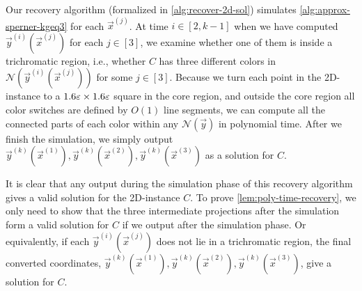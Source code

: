 \begin{algorithm2e}[t]
    \caption{Recover a $2${\rm D}-\Sperner solution from \outofk Approximate \Sperner solutions}
    \label{alg:recover-2d-sol}

    \DontPrintSemicolon




\end{algorithm2e}

Our recovery algorithm (formalized in \cref{alg:recover-2d-sol}) simulates \cref{alg:approx-sperner-kgeq3} for each $\vec{x}^{(j)}$.
At time $i\in [2,k-1]$ when we have computed $\vec{y}^{(i)}(\vec{x}^{(j)})$ for each $j\in [3]$, we examine whether one of them is inside a trichromatic region, i.e., whether $C$ has three different colors in $\mathcal{N}(\vec{y}^{(i)}(\vec{x}^{(j)}))$ for some $j\in [3]$.
Because we turn each point in the 2D-\rect\Sperner instance to a $1.6\varepsilon\times 1.6\varepsilon$ square in the core region, and outside the core region all color switches are defined by $O(1)$ line segments, we can compute all the connected parts of each color within any $\mathcal{N}(\vec{y})$ in polynomial time. 
After we finish the simulation, we simply output $\vec{y}^{(k)}(\vec{x}^{(1)}), \vec{y}^{(k)}(\vec{x}^{(2)}), \vec{y}^{(k)}(\vec{x}^{(3)})$ as a solution for $C$. 

It is clear that any output during the simulation phase of this recovery algorithm gives a valid solution for the 2{\rm D}-\Sperner instance $C$. 
To prove \cref{lem:poly-time-recovery}, we only need to show that the three intermediate projections after the simulation form a valid solution for $C$ if we output after the simulation phase. 
Or equivalently, if each $\vec{y}^{(i)}(\vec{x}^{(j)})$ does not lie in a trichromatic region, the final converted coordinates, $\vec{y}^{(k)}(\vec{x}^{(1)}), \vec{y}^{(k)}(\vec{x}^{(2)}), \vec{y}^{(k)}(\vec{x}^{(3)})$, give a solution for $C$.

